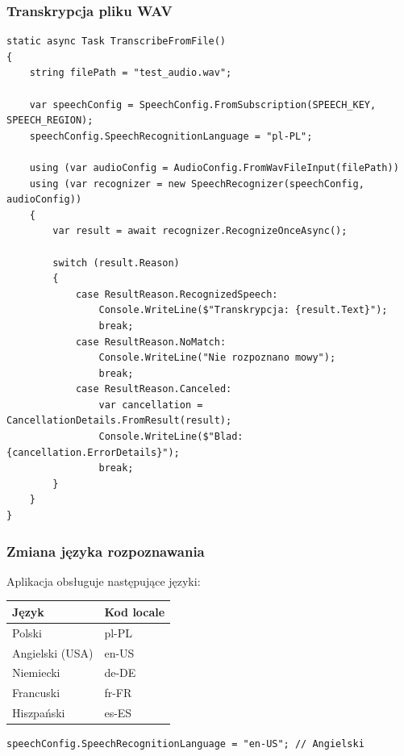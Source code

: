 \documentclass[twoside]{article}
\begin{document}
\subsubsection{Transkrypcja pliku WAV}

\begin{lstlisting}
static async Task TranscribeFromFile()
{
    string filePath = "test_audio.wav";
    
    var speechConfig = SpeechConfig.FromSubscription(SPEECH_KEY, SPEECH_REGION);
    speechConfig.SpeechRecognitionLanguage = "pl-PL";
    
    using (var audioConfig = AudioConfig.FromWavFileInput(filePath))
    using (var recognizer = new SpeechRecognizer(speechConfig, audioConfig))
    {
        var result = await recognizer.RecognizeOnceAsync();
        
        switch (result.Reason)
        {
            case ResultReason.RecognizedSpeech:
                Console.WriteLine($"Transkrypcja: {result.Text}");
                break;
            case ResultReason.NoMatch:
                Console.WriteLine("Nie rozpoznano mowy");
                break;
            case ResultReason.Canceled:
                var cancellation = CancellationDetails.FromResult(result);
                Console.WriteLine($"Blad: {cancellation.ErrorDetails}");
                break;
        }
    }
}
\end{lstlisting}

\subsubsection{Zmiana języka rozpoznawania}

Aplikacja obsługuje następujące języki:

\begin{center}
	\begin{tabular}{|l|l|}
		\hline
		\textbf{Język} & \textbf{Kod locale} \\
		\hline
		Polski & pl-PL \\
		Angielski (USA) & en-US \\
		Niemiecki & de-DE \\
		Francuski & fr-FR \\
		Hiszpański & es-ES \\
		\hline
	\end{tabular}
\end{center}

\begin{lstlisting}
speechConfig.SpeechRecognitionLanguage = "en-US"; // Angielski
\end{lstlisting}
\end{document}
